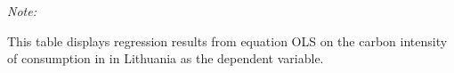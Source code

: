 \begin{table}[htbp!]
\begin{adjustbox}{width = 1\textwidth, max height = 0.95\textheight, center}
\begin{threeparttable}[b]
         \begin{tablenotes}\item \medskip \textit{Note:}
            \item This table displays regression results from equation OLS on the carbon intensity of consumption in  in Lithuania as the dependent variable. 
         \end{tablenotes}
      \end{threeparttable}
   \end{adjustbox}
\end{table}


